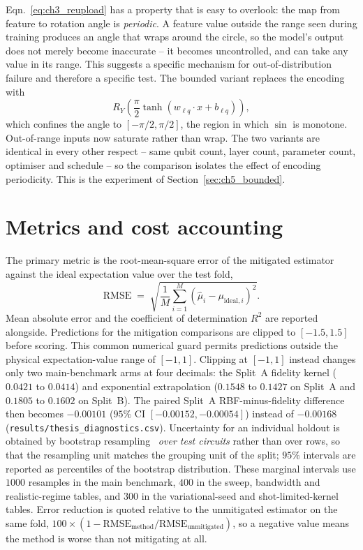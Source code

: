 \documentclass[Thesis.tex]{subfiles}
\begin{document}
Eqn.~\eqref{eq:ch3_reupload} has a property that is easy to overlook: the map from
feature to rotation angle is \emph{periodic}. A feature value outside the range seen
during training produces an angle that wraps around the circle, so the model's output
does not merely become inaccurate -- it becomes uncontrolled, and can take any value
in its range. This suggests a specific mechanism for out-of-distribution failure and
therefore a specific test. The bounded variant replaces the encoding with
\begin{equation}
    R_Y\!\left( \frac{\pi}{2} \tanh\!\left( w_{\ell q} \cdot x + b_{\ell q} \right) \right),
    \label{eq:ch3_bounded}
\end{equation}
which confines the angle to $[-\pi/2, \pi/2]$, the region in which $\sin$ is
monotone. Out-of-range inputs now saturate rather than wrap. The two variants are
identical in every other respect -- same qubit count, layer count, parameter count,
optimiser and schedule -- so the comparison isolates the effect of encoding
periodicity. This is the experiment of Section~\ref{sec:ch5_bounded}.

\section{Metrics and cost accounting}\label{sec:ch3_metrics}

The primary metric is the root-mean-square error of the mitigated estimator against
the ideal expectation value over the test fold,
\begin{equation}
    \mathrm{RMSE} \;=\;
    \sqrt{ \frac{1}{M} \sum_{i=1}^{M}
    \left( \widehat{\mu}_i - \mu_{\text{ideal}, i} \right)^2 } .
    \label{eq:ch3_rmse}
\end{equation}
Mean absolute error and the coefficient of determination $R^2$ are reported
alongside. Predictions for the mitigation comparisons are clipped to
$[-1.5,1.5]$ before scoring. This common numerical guard permits predictions
outside the physical expectation-value range of $[-1,1]$. Clipping at $[-1,1]$
instead changes only two main-benchmark arms at four decimals: the Split~A
fidelity kernel ($0.0421$ to $0.0414$) and exponential extrapolation ($0.1548$ to
$0.1427$ on Split~A and $0.1805$ to $0.1602$ on Split~B). The paired Split~A
RBF-minus-fidelity difference then becomes $-0.00101$ ($95\%$ CI
$[-0.00152,\allowbreak -0.00054]$) instead of $-0.00168$
(\texttt{results/thesis\_diagnostics.csv}).
Uncertainty for an individual holdout is obtained by bootstrap
resampling~\cite{efron1979bootstrap} \emph{over
test circuits} rather than over rows, so that the resampling unit matches the
grouping unit of the split; $95\%$ intervals are reported as percentiles of the
bootstrap distribution. These marginal intervals use $1000$ resamples in the main
benchmark, $400$ in the sweep, bandwidth and realistic-regime tables, and $300$ in
the variational-seed and shot-limited-kernel tables. Error reduction is quoted relative to the unmitigated
estimator on the same fold,
$100 \times (1 - \mathrm{RMSE}_{\text{method}} / \mathrm{RMSE}_{\text{unmitigated}})$,
so a negative value means the method is worse than not mitigating at all.
\end{document}
